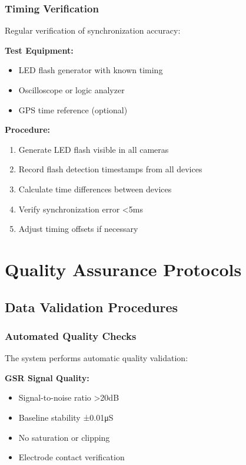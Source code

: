 \subsubsection{Timing Verification}

Regular verification of synchronization accuracy:

\textbf{Test Equipment:}
\begin{itemize}
\item LED flash generator with known timing
\item Oscilloscope or logic analyzer
\item GPS time reference (optional)
\end{itemize}

\textbf{Procedure:}
\begin{enumerate}
\item Generate LED flash visible in all cameras
\item Record flash detection timestamps from all devices
\item Calculate time differences between devices
\item Verify synchronization error <5ms
\item Adjust timing offsets if necessary
\end{enumerate}

\section{Quality Assurance Protocols}

\subsection{Data Validation Procedures}

\subsubsection{Automated Quality Checks}

The system performs automatic quality validation:

\textbf{GSR Signal Quality:}
\begin{itemize}
\item Signal-to-noise ratio >20dB
\item Baseline stability ±0.01μS
\item No saturation or clipping
\item Electrode contact verification
\end{itemize}

